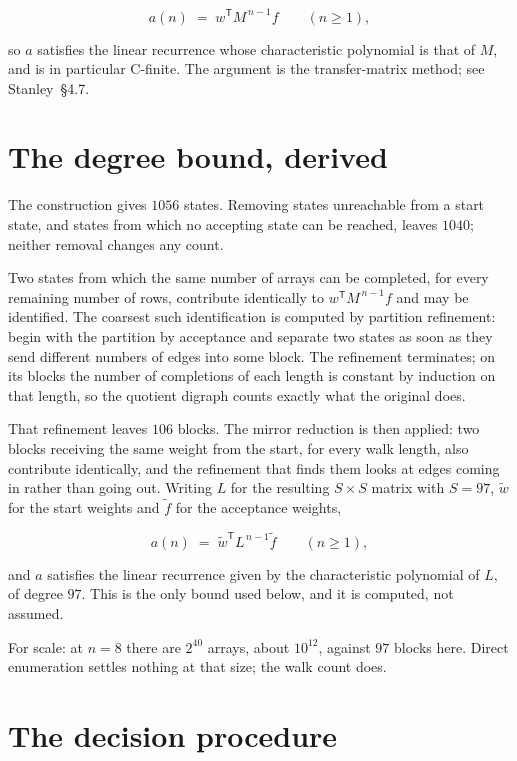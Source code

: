 \documentclass[11pt]{article}
\theoremstyle{definition}
\begin{document}
\[a(n) \;=\; w^{\mathsf T} M^{\,n-1} f \qquad (n \ge 1),\]

so $a$ satisfies the linear recurrence whose characteristic polynomial is that of $M$, and is in particular C-finite. The argument is the transfer-matrix method; see Stanley~\S4.7.

\section{The degree bound, derived}

The construction gives $1056$ states. Removing states unreachable from a start state, and states from which no accepting state can be reached, leaves $1040$; neither removal changes any count.

Two states from which the same number of arrays can be completed, for every remaining number of rows, contribute identically to $w^{\mathsf T}M^{\,n-1}f$ and may be identified. The coarsest such identification is computed by partition refinement: begin with the partition by acceptance and separate two states as soon as they send different numbers of edges into some block. The refinement terminates; on its blocks the number of completions of each length is constant by induction on that length, so the quotient digraph counts exactly what the original does.

That refinement leaves $106$ blocks. The mirror reduction is then applied: two blocks receiving the same weight from the start, for every walk length, also contribute identically, and the refinement that finds them looks at edges coming in rather than going out. Writing $L$ for the resulting $S \times S$ matrix with $S = 97$, $\tilde w$ for the start weights and $\tilde f$ for the acceptance weights,

\[a(n) \;=\; \tilde w^{\mathsf T} L^{\,n-1} \tilde f \qquad (n \ge 1),\]

and $a$ satisfies the linear recurrence given by the characteristic polynomial of $L$, of degree $97$. This is the only bound used below, and it is computed, not assumed.

For scale: at $n = 8$ there are $2^{40}$ arrays, about $10^{12}$, against $97$ blocks here. Direct enumeration settles nothing at that size; the walk count does.

\section{The decision procedure}
\end{document}
